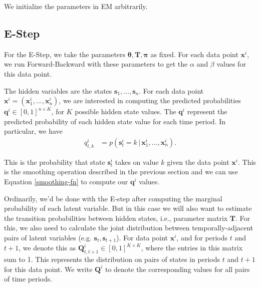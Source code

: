We initialize the parameters in EM arbitrarily. 

\subsection{E-Step}

For the E-Step, we take the parameters $\boldsymbol{\theta}, \textbf{T}, \boldsymbol{\pi}$ as fixed.  For each data point $\mathbf{x}^i$, we run Forward-Backward with these parameters to get the $\alpha$ and $\beta$ values for this data point.

The hidden variables are the states $\textbf{s}_1, ..., \textbf{s}_n$. For each data point $\textbf{x}^i = (\textbf{x}_1^i, ..., \textbf{x}_n^i)$, we are interested in computing the predicted probabilities $\textbf{q}^i \in [0,1]^{n \times K}$, for $K$ possible hidden state values. The $\textbf{q}^i$ represent the predicted probability of each hidden state value for each time period.
%
In particular,  we have 
\begin{align}
	q_{t, k}^i &= p(\textbf{s}_{t}^i = k \, |\,  \textbf{x}_1^i, ..., \textbf{x}_n^i).
\end{align}


This is the probability that state $\textbf{s}_{t}^i$ takes on value $k$ given the data point $\textbf{x}^i$.  This is the smoothing operation described in the previous section and we can use Equation \ref{smoothing-fn} to compute our $\textbf{q}^i$ values.

Ordinarily, we'd be done with the E-step after computing the marginal probability of each latent variable. But in this case we will also want to estimate the transition probabilities between  hidden states, i.e.,
parameter matrix $\textbf{T}$.
%
For this, we also need to calculate the joint distribution between temporally-adjacent pairs of latent variables (e.g. $\textbf{s}_t,\textbf{s}_{t+1}$). For data point $\textbf{x}^i$, and for periods $t$ and $t+1$, we denote this as $\textbf{Q}_{t, t+1}^i \in [0,1]^{K \times K}$, where the entries in this matrix sum to 1.
This represents the distribution on pairs of states in periods $t$ and $t+1$ for this data point. 
%
We write $\textbf{Q}^i$ to denote the corresponding values for all pairs of time periods.


